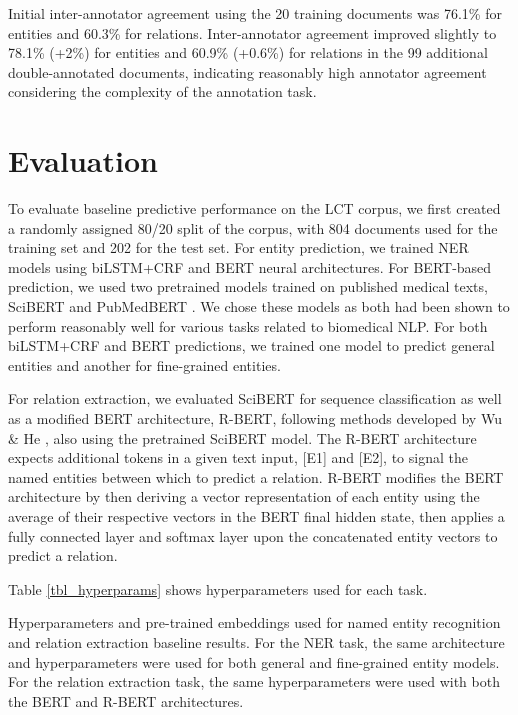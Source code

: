 \documentclass[../main.tex]{subfiles}
\begin{document}
Initial inter-annotator agreement using the 20 training documents was 76.1\% for entities and 60.3\% for relations. Inter-annotator agreement improved slightly to 78.1\% (+2\%) for entities and 60.9\% (+0.6\%) for relations in the 99 additional double-annotated documents, indicating reasonably high annotator agreement considering the complexity of the annotation task.

\section{Evaluation}
To evaluate baseline predictive performance on the LCT corpus, we first created a randomly assigned 80/20 split of the corpus, with 804 documents used for the training set and 202 for the test set. For entity prediction, we trained NER models using biLSTM+CRF and BERT \cite{devlin2018bert} neural architectures. For BERT-based prediction, we used two pretrained models trained on published medical texts, SciBERT \cite{beltagy2019scibert} and PubMedBERT \cite{gu2021domain}. We chose these models as both had been shown to perform reasonably well for various tasks related to biomedical NLP. For both biLSTM+CRF and BERT predictions, we trained one model to predict general entities and another for fine-grained entities. 

For relation extraction, we evaluated SciBERT for sequence classification as well as a modified BERT architecture, R-BERT, following methods developed by Wu \& He \cite{wu2019enriching}, also using the pretrained SciBERT model. The R-BERT architecture expects additional tokens in a given text input, [E1] and [E2], to signal the named entities between which to predict a relation. R-BERT modifies the BERT architecture by then deriving a vector representation of each entity using the average of their respective vectors in the BERT final hidden state, then applies a fully connected layer and softmax layer upon the concatenated entity vectors to predict a relation.

Table \ref{tbl_hyperparams} shows hyperparameters used for each task.

\def\arraystretch{1.2}
\begin{table}[h!]
  \centering
  \def\arraystretch{1}
  \footnotesize
  
  \caption{Hyperparameters and pre-trained embeddings used for named entity recognition and relation extraction baseline results. For the NER task, the same architecture and hyperparameters were used for both general and fine-grained entity models. For the relation extraction task, the same hyperparameters were used with both the BERT and R-BERT architectures.}
  \label{tbl_hyperparams}
\end{table}
\end{document}
